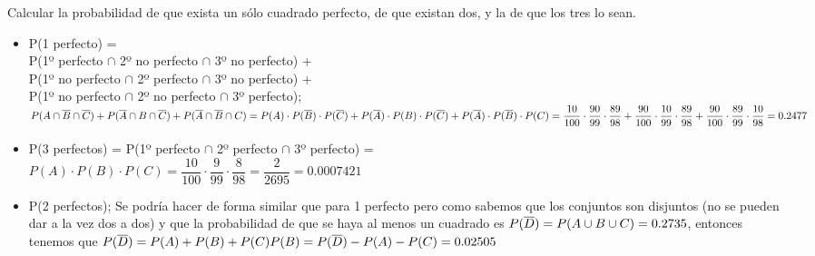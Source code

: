 \subproblem
Calcular la probabilidad de que exista un sólo cuadrado perfecto, de que existan dos, y la de que los tres lo sean.
\begin{itemize}
    \item P(1 perfecto) = \\
    P(1º perfecto $\cap$ 2º no perfecto $\cap$ 3º no perfecto) + \\
    P(1º no perfecto $\cap$ 2º perfecto $\cap$ 3º no perfecto) + \\ 
    P(1º no perfecto $\cap$ 2º no perfecto $\cap$ 3º perfecto); \\
    $P(A\cap \overline{B} \cap \overline{C}) + 
     P(\overline{A}\cap B \cap \overline{C}) + 
     P(\overline{A}\cap \overline{B} \cap C)  = \\
     P(A)\cdot P(\overline{B}) \cdot P(\overline{C}) + 
     P(\overline{A})\cdot P(B) \cdot P(\overline{C}) +
     P(\overline{A})\cdot P(\overline{B}) \cdot P(C) = \\
    \dfrac{10}{100}\cdot \dfrac{90}{99} \cdot \dfrac{89}{98} + 
    \dfrac{90}{100}\cdot \dfrac{10}{99} \cdot \dfrac{89}{98} + 
    \dfrac{90}{100}\cdot \dfrac{89}{99} \cdot \dfrac{10}{98}= 0.2477$ \\
    
    \item P(3 perfectos) = P(1º perfecto $\cap$ 2º perfecto $\cap$ 3º perfecto) = \\ 
    $P(A) \cdot P(B) \cdot P(C) =  \dfrac{10}{100} \cdot\dfrac{9}{99} 
    \cdot\dfrac{8}{98} = \dfrac{2}{2695} = 0.0007421$ \\
    
    \item P(2 perfectos); Se podría hacer de forma similar que para 1 perfecto pero como sabemos que los conjuntos son disjuntos (no se pueden dar a la vez dos a dos) y que la probabilidad de que se haya al menos un cuadrado es $P(\overline D) = \\ 
    P(A\cup B \cup C) = 0.2735$, entonces tenemos que $P(\overline D) = P(A) + P(B) + P(C) \\ 
    P(B) = P(\overline D) - P(A) - P(C) = 0.02505$
\end{itemize}
